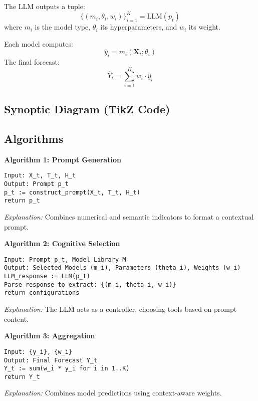 \documentclass[conference]{IEEEtran}
\begin{document}
The LLM outputs a tuple:
\[ \{(m_i, \theta_i, w_i)\}_{i=1}^K = \text{LLM}(p_t) \]
where $m_i$ is the model type, $\theta_i$ its hyperparameters, and $w_i$ its weight.

Each model computes:
\[ \hat{y}_i = m_i(\mathbf{X}_t; \theta_i) \]
The final forecast:
\[ \hat{Y}_t = \sum_{i=1}^K w_i \cdot \hat{y}_i \]

\subsection{Synoptic Diagram (TikZ Code)}

\subsection{Algorithms}
\textbf{Algorithm 1: Prompt Generation}
\begin{verbatim}
Input: X_t, T_t, H_t
Output: Prompt p_t
p_t := construct_prompt(X_t, T_t, H_t)
return p_t
\end{verbatim}
\textit{Explanation:} Combines numerical and semantic indicators to format a contextual prompt.

\textbf{Algorithm 2: Cognitive Selection}
\begin{verbatim}
Input: Prompt p_t, Model Library M
Output: Selected Models (m_i), Parameters (theta_i), Weights (w_i)
LLM_response := LLM(p_t)
Parse response to extract: {(m_i, theta_i, w_i)}
return configurations
\end{verbatim}
\textit{Explanation:} The LLM acts as a controller, choosing tools based on prompt content.

\textbf{Algorithm 3: Aggregation}
\begin{verbatim}
Input: {y_i}, {w_i}
Output: Final Forecast Y_t
Y_t := sum(w_i * y_i for i in 1..K)
return Y_t
\end{verbatim}
\textit{Explanation:} Combines model predictions using context-aware weights.
\end{document}

